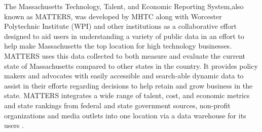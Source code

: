 	The Massachusetts Technology, Talent, and Economic Reporting System,also known as MATTERS, 
	was developed by MHTC along with Worcester Polytechnic Institute (WPI) and other 
	institutions as a collaborative effort designed to aid users in understanding a 
	variety of public data in an effort to help make Massachusetts the top location 
	for high technology businesses. MATTERS uses this data collected to both measure 
	and evaluate the current state of Massachusetts compared to other states in the 
	country. It provides policy makers and advocates with easily accessible and search-able 
	dynamic data to assist in their efforts regarding decisions to help  retain and 
	grow business in the state. MATTERS integrates a wide 
	range of talent, cost, and economic metrics and state rankings from federal and 
	state government sources, non-profit organizations and media outlets into one 
	location via a data warehouse for its users \cite{about}. 

